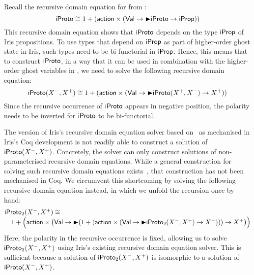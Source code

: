 \newcommand{\Ppol}[1]{X^{#1}}
\newcommand{\Pneg}{\Ppol{-}}
\newcommand{\Ppos}{\Ppol{+}}

Recall the recursive domain equation for \pname from :
\[
\mathsf{iProto} \cong{}
  1 + (\mathsf{action} \times (\mathsf{Val} \to \mathord{\blacktriangleright} \mathsf{iProto} \to \mathsf{iProp}))
\]
This recursive domain equation shows that $\mathsf{iProto}$ depends on the type $\mathsf{iProp}$
of Iris propositions.
To use types that depend on $\mathsf{iProp}$ as part of higher-order ghost state in Iris,
such types need to be bi-functorial in $\mathsf{iProp}$.
Hence, this means that to construct $\mathsf{iProto}$, in a way that it can be used
in combination with the higher-order ghost variables in ,
we need to solve the following recursive domain equation:
\[
  \iProto(\Pneg,\Ppos) \cong{}
  1 + (\newaction \times (\Val \to \latert \iProto(\Ppos,\Pneg) \to \Ppos))
\]
Since the recursive occurrence of $\mathsf{iProto}$ appears in negative position, the
polarity needs to be inverted for $\mathsf{iProto}$ to be bi-functorial.

The version of Iris's recursive domain equation solver based
on~\cite{america-JCSS1989,birkedal-TCS2010} as mechanised in Iris's Coq
development is not readily able to construct a solution of $\iProto(\Pneg,\Ppos)$.
Concretely, the solver can only construct solutions of non-parameterised
recursive domain equations.
While a general construction for solving such recursive domain
equations exists~\cite[\S~7]{birkedal-LMCS2012}, that construction has not been
mechanised in Coq.
We circumvent this shortcoming by solving the following recursive domain
equation instead, in which we unfold the recursion once by hand:
\[\begin{array}{@{}l@{}}
  \iProto_2(\Pneg,\Ppos) \cong{}\\
  \quad
    \begin{array}{@{}l@{}}
      1 + \Big(\newaction \times \big(\Val \to
        \latert (1 + (\newaction \times
        (\Val \to \latert \iProto_2(\Pneg,\Ppos)\to \Pneg))) \to
        \Ppos\big)\Big)
    \end{array}
\end{array}\]
Here, the polarity in the recursive occurrence is fixed, allowing us to solve
$\iProto_2(\Pneg,\Ppos)$ using Iris's existing recursive domain equation solver.
This is sufficient because a solution of $\iProto_2(\Pneg,\Ppos)$ is isomorphic
to a solution of $\iProto(\Pneg,\Ppos)$.
